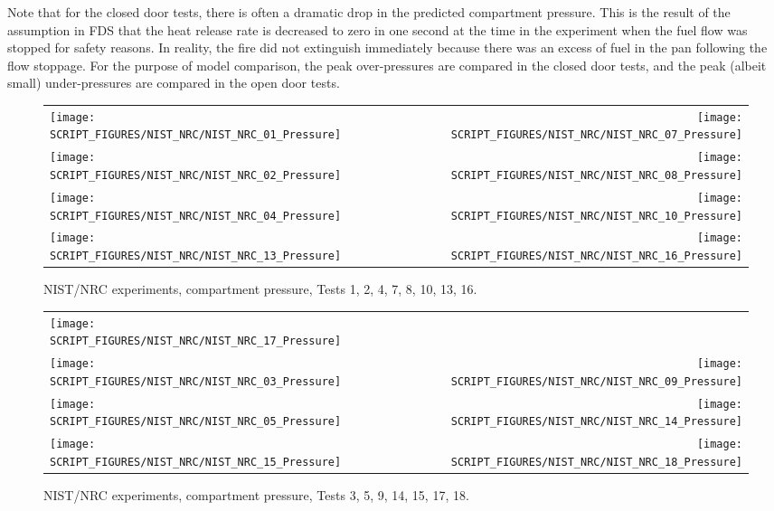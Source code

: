 Note that for the closed door tests, there is often a dramatic drop in the predicted compartment pressure. This is the result of the assumption in FDS that the heat release rate is decreased to zero in one second at the time in the experiment when the fuel flow was stopped for safety reasons.  In reality, the fire did not extinguish immediately because there was an excess of fuel in the pan following the flow stoppage. For the purpose of model comparison, the peak over-pressures are compared in the closed door tests, and the peak (albeit small) under-pressures are compared in the open door tests.

\newpage

\begin{figure}[p]
\begin{tabular*}{\textwidth}{l@{\extracolsep{\fill}}r}
\texttt{[image: SCRIPT\_FIGURES/NIST\_NRC/NIST\_NRC\_01\_Pressure]} &
\texttt{[image: SCRIPT\_FIGURES/NIST\_NRC/NIST\_NRC\_07\_Pressure]} \\
\texttt{[image: SCRIPT\_FIGURES/NIST\_NRC/NIST\_NRC\_02\_Pressure]} &
\texttt{[image: SCRIPT\_FIGURES/NIST\_NRC/NIST\_NRC\_08\_Pressure]} \\
\texttt{[image: SCRIPT\_FIGURES/NIST\_NRC/NIST\_NRC\_04\_Pressure]} &
\texttt{[image: SCRIPT\_FIGURES/NIST\_NRC/NIST\_NRC\_10\_Pressure]} \\
\texttt{[image: SCRIPT\_FIGURES/NIST\_NRC/NIST\_NRC\_13\_Pressure]} &
\texttt{[image: SCRIPT\_FIGURES/NIST\_NRC/NIST\_NRC\_16\_Pressure]}
\end{tabular*}
\caption{NIST/NRC experiments, compartment pressure, Tests 1, 2, 4, 7, 8, 10, 13, 16.}
\label{NIST_NRC_Pressure_Closed}
\end{figure}

\begin{figure}[p]
\begin{tabular*}{\textwidth}{l@{\extracolsep{\fill}}r}
\texttt{[image: SCRIPT\_FIGURES/NIST\_NRC/NIST\_NRC\_17\_Pressure]} &
   \\
\texttt{[image: SCRIPT\_FIGURES/NIST\_NRC/NIST\_NRC\_03\_Pressure]} &
\texttt{[image: SCRIPT\_FIGURES/NIST\_NRC/NIST\_NRC\_09\_Pressure]} \\
\texttt{[image: SCRIPT\_FIGURES/NIST\_NRC/NIST\_NRC\_05\_Pressure]} &
\texttt{[image: SCRIPT\_FIGURES/NIST\_NRC/NIST\_NRC\_14\_Pressure]} \\
\texttt{[image: SCRIPT\_FIGURES/NIST\_NRC/NIST\_NRC\_15\_Pressure]} &
\texttt{[image: SCRIPT\_FIGURES/NIST\_NRC/NIST\_NRC\_18\_Pressure]}
\end{tabular*}
\caption{NIST/NRC experiments, compartment pressure, Tests 3, 5, 9, 14, 15, 17, 18.}
\label{NIST_NRC_Pressure_Open}
\end{figure}

